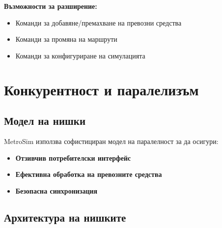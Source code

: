 \documentclass{article}
\begin{document}
\textbf{Възможности за разширение:}
\begin{itemize}
	\item Команди за добавяне/премахване на превозни средства
	\item Команди за промяна на маршрути
	\item Команди за конфигуриране на симулацията
\end{itemize}

\section{Конкурентност и паралелизъм}

\subsection{Модел на нишки}

MetroSim използва софистициран модел на паралелност за да осигури:
\begin{itemize}
	\item \textbf{Отзивчив потребителски интерфейс}
	\item \textbf{Ефективна обработка на превозните средства}
	\item \textbf{Безопасна синхронизация}
\end{itemize}

\subsection{Архитектура на нишките}
\end{document}
